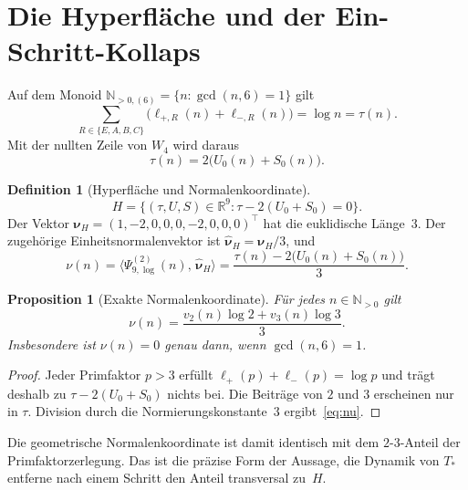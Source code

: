 \documentclass[11pt,a4paper]{article}
\theoremstyle{plain}
\newtheorem{proposition}[theorem]{Proposition}
\theoremstyle{definition}
\newtheorem{definition}[theorem]{Definition}
\newcommand{\N}{\mathbb{N}}
\newcommand{\R}{\mathbb{R}}
\numberwithin{equation}{section}
\begin{document}
\section{Die Hyperfläche und der Ein-Schritt-Kollaps}

Auf dem Monoid $\N_{>0,(6)}=\{n:\gcd(n,6)=1\}$ gilt
\begin{equation}
\sum_{R\in\{E,A,B,C\}}\bigl(\ell_{+,R}(n)+\ell_{-,R}(n)\bigr)
=\log n=\tau(n).
\end{equation}
Mit der nullten Zeile von $W_4$ wird daraus
\begin{equation}
\label{eq:tauUS}
\tau(n)=2\bigl(U_0(n)+S_0(n)\bigr).
\end{equation}

\begin{definition}[Hyperfläche und Normalenkoordinate]
\begin{equation}
H=\bigl\{(\tau,U,S)\in\R^9:\tau-2(U_0+S_0)=0\bigr\}.
\end{equation}
Der Vektor $\boldsymbol{\nu}_H=(1,-2,0,0,0,-2,0,0,0)^\top$ hat die euklidische
Länge~$3$.
Der zugehörige Einheitsnormalenvektor ist
$\widehat{\boldsymbol{\nu}}_H=\boldsymbol{\nu}_H/3$, und
\begin{equation}
\nu(n)
=\bigl\langle\Psi_{9,\log}^{(2)}(n),\,\widehat{\boldsymbol{\nu}}_H\bigr\rangle
=\frac{\tau(n)-2\bigl(U_0(n)+S_0(n)\bigr)}{3}.
\end{equation}
\end{definition}

\begin{proposition}[Exakte Normalenkoordinate]
Für jedes $n\in\N_{>0}$ gilt
\begin{equation}
\label{eq:nu}
\nu(n)=\frac{v_2(n)\log 2+v_3(n)\log 3}{3}.
\end{equation}
Insbesondere ist $\nu(n)=0$ genau dann, wenn $\gcd(n,6)=1$.
\end{proposition}

\begin{proof}
Jeder Primfaktor $p>3$ erfüllt $\ell_+(p)+\ell_-(p)=\log p$ und trägt deshalb
zu $\tau-2(U_0+S_0)$ nichts bei.
Die Beiträge von $2$ und $3$ erscheinen nur in $\tau$.
Division durch die Normierungskonstante~$3$ ergibt~\eqref{eq:nu}.
\end{proof}

Die geometrische Normalenkoordinate ist damit identisch mit dem
$2$-$3$-Anteil der Primfaktorzerlegung.
Das ist die präzise Form der Aussage, die Dynamik von $T_*$ entferne nach
einem Schritt den Anteil transversal zu~$H$.
\end{document}
